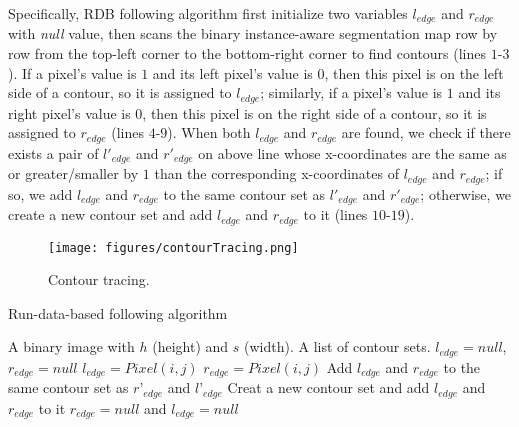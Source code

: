 \documentclass{article}
\begin{document}
Specifically, RDB following algorithm first initialize two variables $l_{edge}$ and $r_{edge}$ with \emph{null} value, then scans the binary instance-aware segmentation map row by row from the top-left corner to the bottom-right corner to find contours (lines $1$-$3$). If a pixel's value is $1$ and its left pixel's value is $0$, then this pixel is on the left side of a contour, so it is assigned to $l_{edge}$; similarly, if a pixel's value is $1$ and its right pixel's value is $0$, then this pixel is on the right side of a contour, so it is assigned to $r_{edge}$ (lines $4$-$9$). When both $l_{edge}$ and $r_{edge}$ are found, we check if there exists a pair of $l'_{edge}$ and $r'_{edge}$ on above line whose x-coordinates are the same as or greater/smaller by $1$ than the corresponding x-coordinates of $l_{edge}$ and $r_{edge}$; if so, we add $l_{edge}$ and $r_{edge}$ to the same contour set as $l'_{edge}$ and $r'_{edge}$; otherwise, we create a new contour set and add $l_{edge}$ and $r_{edge}$ to it (lines $10$-$19$).





\begin{figure*}[!t]
  \centering
     \texttt{[image: figures/contourTracing.png]}\label{fig:contour_tracing}
  \caption{Contour tracing.}
  \end{figure*}




\begin{algorithm}[!t]
  \caption{Run-data-based following algorithm\label{rdb}}
  \begin{algorithmic}[1]
     \Require
     A binary image with $h$ (height) and $s$ (width).
     \Ensure
     A list of contour sets.
		\State $l_{edge} = null$, $r_{edge} = null$
		\For{$j$ in $[0:h)$}
			\For{$i$ in $[0:s)$}
					\State $l_{edge} = Pixel(i,j)$
				\EndIf
					\State $r_{edge} = Pixel(i,j)$
				\EndIf
						\State Add $l_{edge}$ and $r_{edge}$ to the same contour set as $r’_{edge}$ and $l’_{edge}$
					\Else
						\State Creat a new contour set and add $l_{edge}$ and $r_{edge}$  to it
					\EndIf
					\State $r_{edge}= null$ and $l_{edge} = null$
				\EndIf
			\EndFor
		 \EndFor
  \end{algorithmic}
\end{algorithm}
\end{document}
